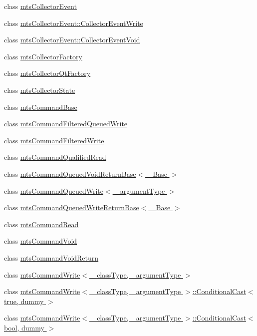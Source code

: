\begin{DoxyCompactItemize}
\item 
class \hyperlink{classmts_collector_event}{mts\+Collector\+Event}
\item 
class \hyperlink{classmts_collector_event_1_1_collector_event_write}{mts\+Collector\+Event\+::\+Collector\+Event\+Write}
\item 
class \hyperlink{classmts_collector_event_1_1_collector_event_void}{mts\+Collector\+Event\+::\+Collector\+Event\+Void}
\item 
class \hyperlink{classmts_collector_factory}{mts\+Collector\+Factory}
\item 
class \hyperlink{classmts_collector_qt_factory}{mts\+Collector\+Qt\+Factory}
\item 
class \hyperlink{classmts_collector_state}{mts\+Collector\+State}
\item 
class \hyperlink{classmts_command_base}{mts\+Command\+Base}
\item 
class \hyperlink{classmts_command_filtered_queued_write}{mts\+Command\+Filtered\+Queued\+Write}
\item 
class \hyperlink{classmts_command_filtered_write}{mts\+Command\+Filtered\+Write}
\item 
class \hyperlink{classmts_command_qualified_read}{mts\+Command\+Qualified\+Read}
\item 
class \hyperlink{classmts_command_queued_void_return_base}{mts\+Command\+Queued\+Void\+Return\+Base$<$ \+\_\+\+Base $>$}
\item 
class \hyperlink{classmts_command_queued_write}{mts\+Command\+Queued\+Write$<$ \+\_\+argument\+Type $>$}
\item 
class \hyperlink{classmts_command_queued_write_return_base}{mts\+Command\+Queued\+Write\+Return\+Base$<$ \+\_\+\+Base $>$}
\item 
class \hyperlink{classmts_command_read}{mts\+Command\+Read}
\item 
class \hyperlink{classmts_command_void}{mts\+Command\+Void}
\item 
class \hyperlink{classmts_command_void_return}{mts\+Command\+Void\+Return}
\item 
class \hyperlink{classmts_command_write}{mts\+Command\+Write$<$ \+\_\+class\+Type, \+\_\+argument\+Type $>$}
\item 
class \hyperlink{classmts_command_write_1_1_conditional_cast_3_01true_00_01dummy_01_4}{mts\+Command\+Write$<$ \+\_\+class\+Type, \+\_\+argument\+Type $>$\+::\+Conditional\+Cast$<$ true, dummy $>$}
\item 
class \hyperlink{classmts_command_write_1_1_conditional_cast}{mts\+Command\+Write$<$ \+\_\+class\+Type, \+\_\+argument\+Type $>$\+::\+Conditional\+Cast$<$ bool, dummy $>$}

\end{DoxyCompactItemize}

